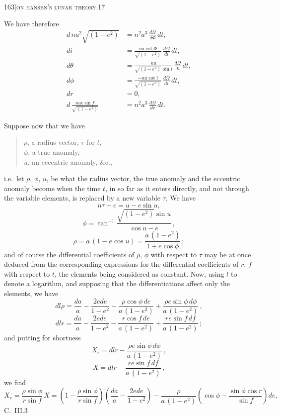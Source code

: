\documentclass[11pt]{article}
\begin{document}
\newpage

\begin{center}
\small 163]\hfill\textsc{on hansen's lunar theory.}\hfill\textsc{17}
\end{center}

\medskip

\noindent We have therefore
\begin{align*}
d\,na^{2}\sqrt{(1-e^{2})} &= n^{2}a^{3}\,\frac{d\Omega}{d\Phi}\,dt,\\
di &= \frac{na\cot\Phi}{\sqrt{(1-e^{2})}}\,\frac{d\Omega}{di}\,dt,\\
d\theta &= \frac{na}{\sqrt{(1-e^{2})}\,\sin i}\,\frac{d\Omega}{di}\,dt,\\
d\phi &= \frac{-na\cot i}{\sqrt{(1-e^{2})}}\,\frac{d\Omega}{di}\,dt,\\
dr &= 0,\\
d\,\frac{na e\sin f}{\sqrt{(1-e^{2})}} &= n^{2}a^{3}\,\frac{d\Omega}{dr}\,dt.
\end{align*}

Suppose now that we have
\begin{quote}
$\rho$, a radius vector, $\tau$ for $t$,\\
$\phi$, a true anomaly,\\
$u$, an eccentric anomaly, \&c.,
\end{quote}
i.e.\ let $\rho$, $\phi$, $u$, be what the radius vector, the true anomaly and the eccentric
anomaly become when the time $t$, in so far as it enters directly, and not through the
variable elements, is replaced by a new variable $\tau$. We have
\[
n\tau + c = u - e\sin u,
\]
\[
\phi = \tan^{-1}\frac{\sqrt{(1-e^{2})}\sin u}{\cos u - e}\,,
\]
\[
\rho = a\,(1 - e\cos u) = \frac{a\,(1-e^{2})}{1 + e\cos\phi}\,;
\]
and of course the differential coefficients of $\rho$, $\phi$ with respect to $\tau$ may be at once
deduced from the corresponding expressions for the differential coefficients of $r$, $f$ with
respect to $t$, the elements being considered as constant. Now, using $l$ to denote a
logarithm, and supposing that the differentiations affect only the elements, we have
\[
dl\rho = \frac{da}{a} - \frac{2ede}{1-e^{2}} - \frac{\rho\cos\phi\,de}{a\,(1-e^{2})} + \frac{\rho e\sin\phi\,d\phi}{a\,(1-e^{2})}\,,
\]
\[
dlr = \frac{da}{a} - \frac{2ede}{1-e^{2}} - \frac{r\cos f\,de}{a\,(1-e^{2})} + \frac{r e\sin f\,df}{a\,(1-e^{2})}\,;
\]
and putting for shortness
\[
X_{r} = dlr - \frac{\rho e\sin\phi\,d\phi}{a\,(1-e^{2})}\,,
\]
\[
X = dlr - \frac{r e\sin f\,df}{a\,(1-e^{2})}\,,
\]
we find
\[
X_{r} = \frac{\rho\sin\phi}{r\sin f}\,X = \left(1 - \frac{\rho\sin\phi}{r\sin f}\right)\!\left(\frac{da}{a} - \frac{2ede}{1-e^{2}}\right) - \frac{\rho}{a\,(1-e^{2})}\!\left(\cos\phi - \frac{\sin\phi\cos r}{\sin f}\right)de,
\]
\hbox{}\hfill C.\ III.\hfill 3
\end{document}
